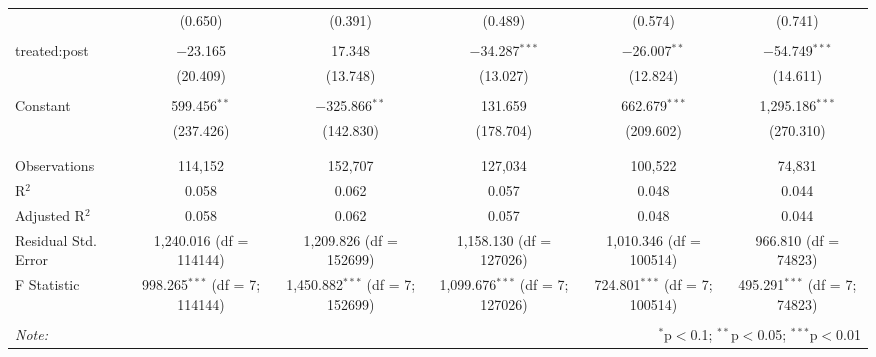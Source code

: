 \begin{table}[!htbp]
\begin{adjustbox}{width=\textwidth}
\begin{tabular}{@{\extracolsep{5pt}}lccccc}
  & (0.650) & (0.391) & (0.489) & (0.574) & (0.741) \\ 
  & & & & & \\ 
 treated:post & $-$23.165 & 17.348 & $-$34.287$^{***}$ & $-$26.007$^{**}$ & $-$54.749$^{***}$ \\ 
  & (20.409) & (13.748) & (13.027) & (12.824) & (14.611) \\ 
  & & & & & \\ 
 Constant & 599.456$^{**}$ & $-$325.866$^{**}$ & 131.659 & 662.679$^{***}$ & 1,295.186$^{***}$ \\ 
  & (237.426) & (142.830) & (178.704) & (209.602) & (270.310) \\ 
  & & & & & \\ 
\hline \\[-1.8ex] 
Observations & 114,152 & 152,707 & 127,034 & 100,522 & 74,831 \\ 
R$^{2}$ & 0.058 & 0.062 & 0.057 & 0.048 & 0.044 \\ 
Adjusted R$^{2}$ & 0.058 & 0.062 & 0.057 & 0.048 & 0.044 \\ 
Residual Std. Error & 1,240.016 (df = 114144) & 1,209.826 (df = 152699) & 1,158.130 (df = 127026) & 1,010.346 (df = 100514) & 966.810 (df = 74823) \\ 
F Statistic & 998.265$^{***}$ (df = 7; 114144) & 1,450.882$^{***}$ (df = 7; 152699) & 1,099.676$^{***}$ (df = 7; 127026) & 724.801$^{***}$ (df = 7; 100514) & 495.291$^{***}$ (df = 7; 74823) \\ 
\hline 
\hline \\[-1.8ex] 
\textit{Note:}  & \multicolumn{5}{r}{$^{*}$p$<$0.1; $^{**}$p$<$0.05; $^{***}$p$<$0.01} \\ 
\end{tabular} 
\end{adjustbox}
\end{table} 
